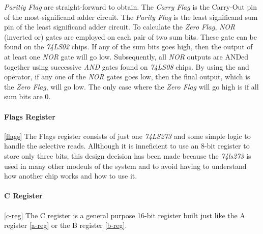 \emph{Paritiy Flag} are straight-forward to obtain. The \emph{Carry Flag} is the Carry-Out pin of the most-significand adder
circuit. The \emph{Parity Flag} is the least significand sum pin of the least significand adder circuit. To calculate the
\emph{Zero Flag}, \emph{NOR} (inverted or) gates are employed on each pair of two sum bits. These gate can be found on the
\emph{74LS02} \cite{74ls02} chips. If any of the sum bits goes high, then the output of at least one \emph{NOR} gate will go low.
Subsequently, all \emph{NOR} outputs are ANDed together using successive \emph{AND} gates found on \emph{74LS08} \cite{74ls08}
chips. By using the and operator, if any one of the \emph{NOR} gates goes low, then the final output, which is the \emph{Zero Flag},
will go low. The only case where the \emph{Zero Flag} will go high is if all sum bits are 0.



\paragraph{Flags Register} \ref{flags}
The Flags register consists of just one \emph{74LS273} \cite{74ls273} and some simple logic to handle the selective reads.
Allthough it is inneficient to use an 8-bit register to store only three bits, this design decision has been made because
the \emph{74ls273} is used in many other modeuls of the system and to avoid having to understand how another chip works and how
to use it.



\paragraph{C Register} \ref{c-reg}
The C register is a general purpose 16-bit register built just like the A register \ref{a-reg} or the B register \ref{b-reg}.



